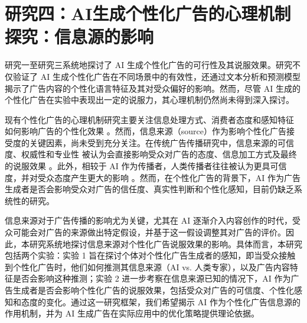 \chapter{研究四：AI生成个性化广告的心理机制探究：信息源的影响}
研究一至研究三系统地探讨了 AI 生成个性化广告的可行性及其说服效果。研究不仅验证了 AI 生成个性化广告在不同场景中的有效性，还通过文本分析和预测模型 揭示了广告内容的个性化语言特征及其对受众偏好的影响。然而，尽管 AI 生成的个性化广告在实验中表现出一定的说服力，其心理机制仍然尚未得到深入探讨。

现有个性化广告的心理机制研究主要关注信息处理方式、消费者态度和感知特征 如何影响广告的个性化效果 \citep{li2016does,dijkstra2012personalization}。然而，信息来源（source）作为影响个性化广告接受度的关键因素，尚未受到充分关注。在传统广告传播研究中，信息来源的可信度、权威性和专业性 被认为会直接影响受众对广告的态度、信息加工方式及最终的说服效果 \citep{pornpitakpan2004persuasiveness,harvey1972effect}。此外，相较于 AI 作为传播者，人类传播者往往被认为更具可信度，并对受众态度产生更大的影响 \citep{dai2024ai}。然而，在个性化广告的背景下，AI 作为广告生成者是否会影响受众对广告的信任度、真实性判断和个性化感知，目前仍缺乏系统性的研究。

信息来源对于广告传播的影响尤为关键，尤其在 AI 逐渐介入内容创作的时代，受众可能会对广告的来源做出特定假设，并基于这一假设调整其对广告的评价。因此，本研究系统地探讨信息来源对个性化广告说服效果的影响。具体而言，本研究包括两个实验：实验 1 旨在探讨个体对个性化广告生成者的感知，即当受众接触到个性化广告时，他们如何推测其信息来源（AI vs. 人类专家），以及广告内容特征是否会影响这种推测；实验 2 进一步考察在信息来源已知的情况下，AI 作为广告生成者是否会影响个性化广告的说服效果，包括受众对广告的可信度、个性化感知和态度的变化。通过这一研究框架，我们希望揭示 AI 作为个性化广告信息源的作用机制，并为 AI 生成广告在实际应用中的优化策略提供理论依据。



